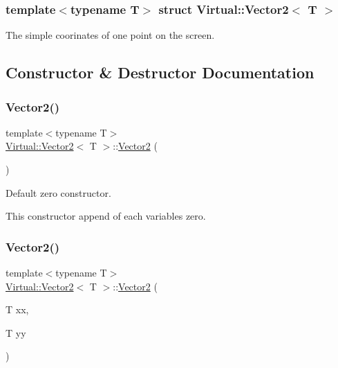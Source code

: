\subsubsection*{template$<$typename T$>$\newline
struct Virtual\+::\+Vector2$<$ T $>$}

The simple coorinates of one point on the screen. 

\subsection{Constructor \& Destructor Documentation}
\hypertarget{struct_virtual_1_1_vector2_add372f623a2a5c19f1f20f491cf7001c}{}\label{struct_virtual_1_1_vector2_add372f623a2a5c19f1f20f491cf7001c} 
\subsubsection{\texorpdfstring{Vector2()}{Vector2()}\hspace{0.1cm}{\footnotesize\ttfamily [1/2]}}
{\footnotesize\ttfamily template$<$typename T$>$ \\
\hyperlink{struct_virtual_1_1_vector2}{Virtual\+::\+Vector2}$<$ T $>$\+::\hyperlink{struct_virtual_1_1_vector2}{Vector2} (\begin{DoxyParamCaption}{ }\end{DoxyParamCaption})\hspace{0.3cm}{\ttfamily [inline]}}



Default zero constructor. 

This constructor append of each variables zero. \hypertarget{struct_virtual_1_1_vector2_a5debf297b5880d21e4ee0748dc620160}{}\label{struct_virtual_1_1_vector2_a5debf297b5880d21e4ee0748dc620160} 
\subsubsection{\texorpdfstring{Vector2()}{Vector2()}\hspace{0.1cm}{\footnotesize\ttfamily [2/2]}}
{\footnotesize\ttfamily template$<$typename T$>$ \\
\hyperlink{struct_virtual_1_1_vector2}{Virtual\+::\+Vector2}$<$ T $>$\+::\hyperlink{struct_virtual_1_1_vector2}{Vector2} (\begin{DoxyParamCaption}\item[{T}]{xx,  }\item[{T}]{yy }\end{DoxyParamCaption})\hspace{0.3cm}{\ttfamily [inline]}}




